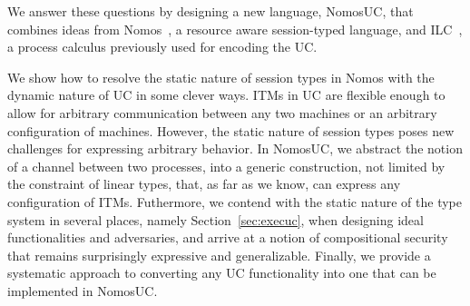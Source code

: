 We answer these questions by designing a new language, NomosUC, that combines ideas from
Nomos~\cite{dasnomos}, a resource aware session-typed language, and ILC~\cite{ilc},
a process calculus previously used for encoding the UC.

We show how to resolve the static nature of session types in Nomos with the dynamic nature of UC in some clever ways. 
ITMs in UC are flexible enough to allow for arbitrary communication between any two machines or an arbitrary configuration of machines.
However, the static nature of session types poses new challenges for expressing arbitrary behavior.
In NomosUC, we abstract the notion of a channel between two processes, into a generic construction, not limited by the constraint
of linear types, that, as far as we know, can express any configuration of ITMs.
Futhermore, we contend with the static nature of the type system in several places, namely Section~\ref{sec:execuc}, when designing ideal functionalities and adversaries,
and arrive at a notion of compositional security that remains surprisingly expressive and generalizable.
Finally, we provide a systematic approach to converting any UC functionality into one that can be implemented in NomosUC.

